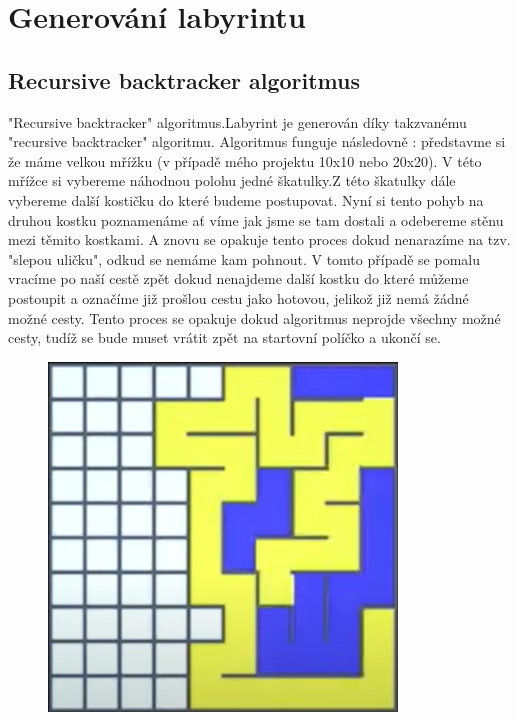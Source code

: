 \documentclass[12pt, a4paper,
twoside        %
]{report}
\let\oldchapter\chapter
\renewcommand{\chapter}{
\clearpage
\pagestyle{plain}
\oldchapter
}
\begin{document}


\chapter{Generování labyrintu}

\section{Recursive backtracker algoritmus}
\label{sec:recursive_backtracker_algoritmus}

{"Recursive backtracker" algoritmus.}Labyrint je generován díky takzvanému "recursive backtracker" algoritmu. Algoritmus funguje následovně : představme si že máme velkou mřížku (v případě mého projektu 10x10 nebo 20x20). V této mřížce si vybereme náhodnou polohu jedné škatulky.Z této škatulky dále vybereme další kostičku do které budeme postupovat. Nyní si tento pohyb na druhou kostku poznamenáme ať víme jak jsme se tam dostali a odebereme stěnu mezi těmito kostkami. A znovu se opakuje tento proces dokud nenarazíme na tzv. "slepou uličku", odkud se nemáme kam pohnout. V tomto případě se pomalu vracíme po naší cestě zpět dokud nenajdeme další kostku do které můžeme postoupit a označíme již prošlou cestu jako hotovou, jelikož již nemá žádné možné cesty. Tento proces se opakuje dokud algoritmus neprojde všechny možné cesty, tudíž se bude muset vrátit zpět na startovní políčko a ukončí se. 

\begin{figure}[h]
    \centering
    \includegraphics[height=0.3\textheight]{image/maze_generation.png}
    \caption{}
\end{figure}
\end{document}
